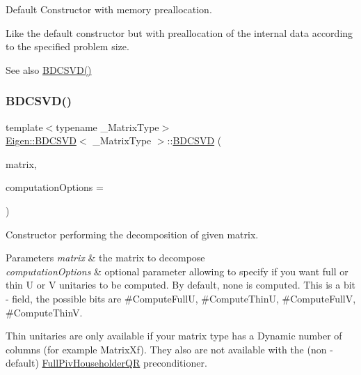 Default Constructor with memory preallocation. 

Like the default constructor but with preallocation of the internal data according to the specified problem size. \begin{DoxySeeAlso}{See also}
\mbox{\hyperlink{class_eigen_1_1_b_d_c_s_v_d_a39514816d38f9c418cf3f3514b511c2c}{B\+D\+C\+S\+V\+D()}} 
\end{DoxySeeAlso}
\mbox{\label{class_eigen_1_1_b_d_c_s_v_d_a302746d9c534cd513c1df87c7ae4850d}} 
\subsubsection{\texorpdfstring{BDCSVD()}{BDCSVD()}\hspace{0.1cm}{\footnotesize\ttfamily [3/3]}}
{\footnotesize\ttfamily template$<$typename \+\_\+\+Matrix\+Type$>$ \\
\mbox{\hyperlink{class_eigen_1_1_b_d_c_s_v_d}{Eigen\+::\+B\+D\+C\+S\+VD}}$<$ \+\_\+\+Matrix\+Type $>$\+::\mbox{\hyperlink{class_eigen_1_1_b_d_c_s_v_d}{B\+D\+C\+S\+VD}} (\begin{DoxyParamCaption}\item[{const Matrix\+Type \&}]{matrix,  }\item[{unsigned int}]{computation\+Options = {} }\end{DoxyParamCaption})\hspace{0.3cm}{\ttfamily [inline]}}



Constructor performing the decomposition of given matrix. 


\begin{DoxyParams}{Parameters}
{\em matrix} & the matrix to decompose \\
\hline
{\em computation\+Options} & optional parameter allowing to specify if you want full or thin U or V unitaries to be computed. By default, none is computed. This is a bit -\/ field, the possible bits are \#\+Compute\+FullU, \#\+Compute\+ThinU, \#\+Compute\+FullV, \#\+Compute\+ThinV.\\
\hline
\end{DoxyParams}
Thin unitaries are only available if your matrix type has a Dynamic number of columns (for example Matrix\+Xf). They also are not available with the (non -\/ default) \mbox{\hyperlink{class_eigen_1_1_full_piv_householder_q_r}{Full\+Piv\+Householder\+QR}} preconditioner. 

